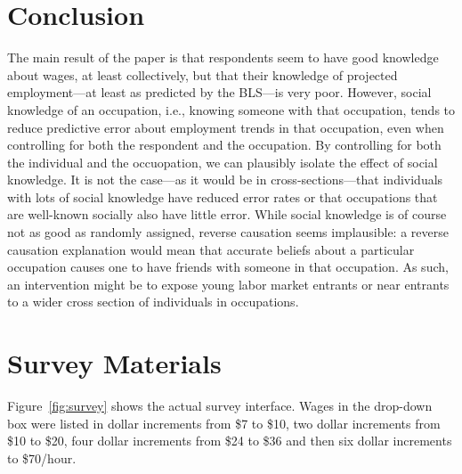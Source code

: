 \documentclass[12pt]{article}
\begin{document}
\section{Conclusion} 

The main result of the paper is that respondents seem to have good knowledge about wages, at least collectively, but that their knowledge of projected employment---at least as predicted by the BLS---is very poor.
However, social knowledge of an occupation, i.e., knowing someone with that occupation, tends to reduce predictive error about employment trends in that occupation, even when controlling for both the respondent and the occupation. 
By controlling for both the individual and the occuopation, we can plausibly isolate the effect of social knowledge. 
It is not the case---as it would be in cross-sections---that individuals with lots of social knowledge have reduced error rates or that occupations that are well-known socially also have little error. 
While social knowledge is of course not as good as randomly assigned, reverse causation seems implausible: 
a reverse causation explanation would mean that accurate beliefs about a particular occupation causes one to have friends with someone in that occupation. 
As such, an intervention might be to expose young labor market entrants or near entrants to a wider cross section of individuals in occupations.
 



\newpage 

\appendix 

\section{Survey Materials} \label{sec:survey}  
Figure~\ref{fig:survey} shows the actual survey interface.  
Wages in the drop-down box were listed in dollar increments from \$7 to \$10, two dollar increments from \$10 to \$20, four dollar increments from \$24 to \$36 and then six dollar increments to \$70/hour.  
\end{document}
